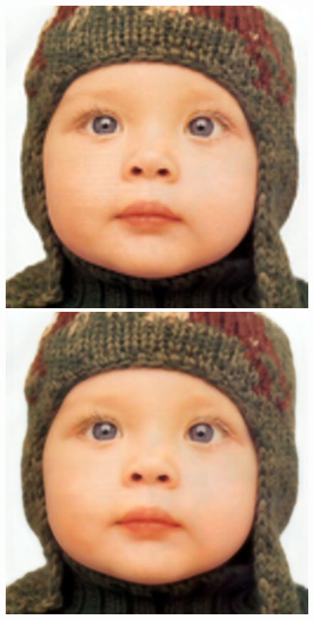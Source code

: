 \documentclass[runningheads]{llncs}
\begin{document}
\begin{figure}[t]
  \includegraphics[trim={100px 280px 300px 160px},width=\mywidth,clip]{set5_1_bicubic.png}
  \includegraphics[trim={100px 280px 300px 160px},width=\mywidth,clip]{set5_1_pix.png}

\end{figure}
\end{document}
